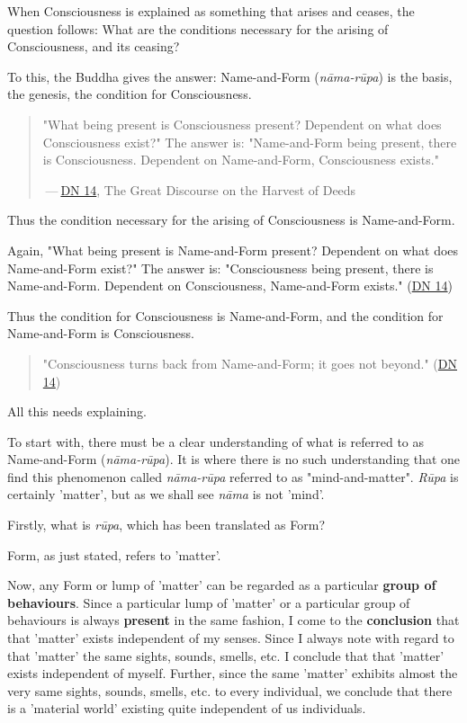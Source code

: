 When Consciousness is explained as something that arises and ceases, the question follows: What are the conditions necessary for the arising of Consciousness, and its ceasing?

To this, the Buddha gives the answer: Name-and-Form (\emph{nāma-rūpa}) is the basis, the genesis, the condition for Consciousness.

\begin{quote}
"What being present is Consciousness present? Dependent on what does Consciousness exist?" The answer is: "Name-and-Form being present, there is Consciousness. Dependent on Name-and-Form, Consciousness exists."

 --- \href{https://suttacentral.net/dn14/en/sujato}{DN 14}, The Great Discourse on the Harvest of Deeds
\end{quote}

Thus the condition necessary for the arising of Consciousness is Name-and-Form.

Again, "What being present is Name-and-Form present? Dependent on what does Name-and-Form exist?" The answer is: "Consciousness being present, there is Name-and-Form. Dependent on Consciousness, Name-and-Form exists." (\href{https://suttacentral.net/dn14/en/sujato}{DN 14})

Thus the condition for Consciousness is Name-and-Form, and the condition for Name-and-Form is Consciousness.

\begin{quote}
"Consciousness turns back from Name-and-Form; it goes not beyond." (\href{https://suttacentral.net/dn14/en/sujato}{DN 14})
\end{quote}

All this needs explaining.

To start with, there must be a clear understanding of what is referred to as Name-and-Form (\emph{nāma-rūpa}). It is where there is no such understanding that one find this phenomenon called \emph{nāma-rūpa} referred to as "mind-and-matter". \emph{Rūpa} is certainly 'matter', but as we shall see \emph{nāma} is not 'mind'.

Firstly, what is \emph{rūpa}, which has been translated as Form?

Form, as just stated, refers to 'matter'.

Now, any Form or lump of 'matter' can be regarded as a particular \textbf{group of behaviours}. Since a particular lump of 'matter' or a particular group of behaviours is always \textbf{present} in the same fashion, I come to the \textbf{conclusion} that that 'matter' exists independent of my senses. Since I always note with regard to that 'matter' the same sights, sounds, smells, etc. I conclude that that 'matter' exists independent of myself. Further, since the same 'matter' exhibits almost the very same sights, sounds, smells, etc. to every individual, we conclude that there is a 'material world' existing quite independent of us individuals.

